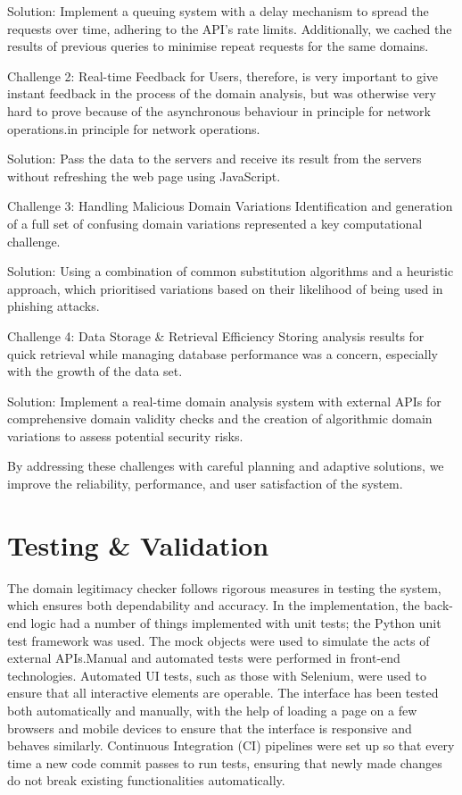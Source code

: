 Solution: Implement a queuing system with a delay mechanism to spread the requests over time, adhering to the API's rate limits. Additionally, we cached the results of previous queries to minimise repeat requests for the same domains.

Challenge 2: Real-time Feedback for Users, therefore, is very important to give instant feedback in the process of the domain analysis, but was otherwise very hard to prove because of the asynchronous behaviour in principle for network operations.in principle for network operations.

Solution: Pass the data to the servers and receive its result from the servers without refreshing the web page using JavaScript. 

Challenge 3: Handling Malicious Domain Variations
Identification and generation of a full set of confusing domain variations represented a key computational challenge.

Solution: Using a combination of common substitution algorithms and a heuristic approach, which prioritised variations based on their likelihood of being used in phishing attacks. 

Challenge 4: Data Storage \& Retrieval Efficiency
Storing analysis results for quick retrieval while managing database performance was a concern, especially with the growth of the data set.

Solution: Implement a real-time domain analysis system with external APIs for comprehensive domain validity checks and the creation of algorithmic domain variations to assess potential security risks. 
 
By addressing these challenges with careful planning and adaptive solutions, we improve the reliability, performance, and user satisfaction of the system.

\section{Testing \& Validation}

The domain legitimacy checker follows rigorous measures in testing the system, which ensures both dependability and accuracy. In the implementation, the back-end logic had a number of things implemented with unit tests; the Python unit test framework was used. The mock objects were used to simulate the acts of external APIs.Manual and automated tests were performed in front-end technologies. Automated UI tests, such as those with Selenium, were used to ensure that all interactive elements are operable. The interface has been tested both automatically and manually, with the help of loading a page on a few browsers and mobile devices to ensure that the interface is responsive and behaves similarly. Continuous Integration (CI) pipelines were set up so that every time a new code commit passes to run tests, ensuring that newly made changes do not break existing functionalities automatically. 

